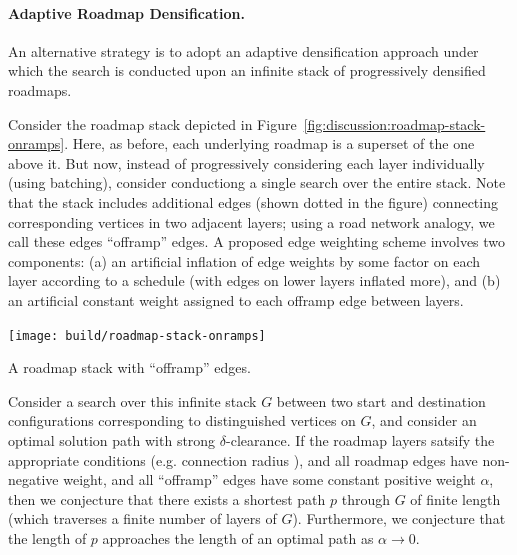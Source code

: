 \paragraph{Adaptive Roadmap Densification.}
An alternative strategy is to adopt an adaptive densification approach
under which the search is conducted upon an infinite stack of
progressively densified roadmaps.

Consider the roadmap stack depicted
in Figure~\ref{fig:discussion:roadmap-stack-onramps}.
Here, as before,
each underlying roadmap is a superset of the one above it.
But now,
instead of progressively considering each layer individually
(using batching),
consider conductiong a single search over the entire stack.
Note that the stack includes additional edges
(shown dotted in the figure)
connecting corresponding vertices in two adjacent layers;
using a road network analogy,
we call these edges ``offramp'' edges.
A proposed edge weighting scheme involves two components:
(a) an artificial inflation of edge weights by some factor
on each layer according to a schedule
(with edges on lower layers inflated more),
and (b) an artificial constant weight assigned to each offramp edge
between layers.


\begin{marginfigure}
   \centering
   \texttt{[image: build/roadmap-stack-onramps]}
   \caption{A roadmap stack with ``offramp'' edges.}
   \label{fig:discussion:roadmap-stack-onramps}
\end{marginfigure}

Consider a search over this infinite stack $G$
between two start and destination
configurations corresponding to distinguished vertices on $G$,
and consider an optimal solution path with strong $\delta$-clearance.
If the roadmap layers satsify the appropriate conditions
(e.g. connection radius
\citep{karaman2011samplingoptimal, janson2015deterministicsampling}),
and all roadmap edges have non-negative weight,
and all ``offramp'' edges have some constant positive weight $\alpha$,
then we conjecture that there exists a shortest path $p$ through $G$
of finite length (which traverses a finite number of layers of $G$).
Furthermore,
we conjecture that the length of $p$ approaches the length of an
optimal path as $\alpha \rightarrow 0$.

